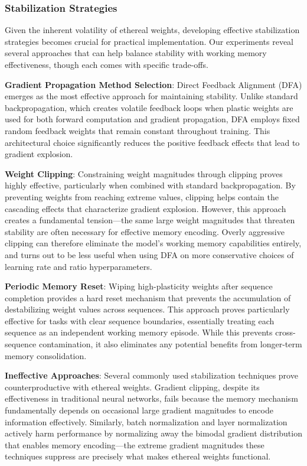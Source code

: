 \documentclass{article} %
\begin{document}
\subsubsection{Stabilization Strategies}

Given the inherent volatility of ethereal weights, developing effective stabilization strategies becomes crucial for practical implementation. Our experiments reveal several approaches that can help balance stability with working memory effectiveness, though each comes with specific trade-offs.

\textbf{Gradient Propagation Method Selection}: Direct Feedback Alignment (DFA) emerges as the most effective approach for maintaining stability. Unlike standard backpropagation, which creates volatile feedback loops when plastic weights are used for both forward computation and gradient propagation, DFA employs fixed random feedback weights that remain constant throughout training. This architectural choice significantly reduces the positive feedback effects that lead to gradient explosion.

\textbf{Weight Clipping}: Constraining weight magnitudes through clipping proves highly effective, particularly when combined with standard backpropagation. By preventing weights from reaching extreme values, clipping helps contain the cascading effects that characterize gradient explosion. However, this approach creates a fundamental tension—the same large weight magnitudes that threaten stability are often necessary for effective memory encoding. Overly aggressive clipping can therefore eliminate the model's working memory capabilities entirely, and turns out to be less useful when using DFA on more conservative choices of learning rate and ratio hyperparameters.

\textbf{Periodic Memory Reset}: Wiping high-plasticity weights after sequence completion provides a hard reset mechanism that prevents the accumulation of destabilizing weight values across sequences. This approach proves particularly effective for tasks with clear sequence boundaries, essentially treating each sequence as an independent working memory episode. While this prevents cross-sequence contamination, it also eliminates any potential benefits from longer-term memory consolidation.

\textbf{Ineffective Approaches}: Several commonly used stabilization techniques prove counterproductive with ethereal weights. Gradient clipping, despite its effectiveness in traditional neural networks, fails because the memory mechanism fundamentally depends on occasional large gradient magnitudes to encode information effectively. Similarly, batch normalization and layer normalization actively harm performance by normalizing away the bimodal gradient distribution that enables memory encoding—the extreme gradient magnitudes these techniques suppress are precisely what makes ethereal weights functional.
\end{document}
